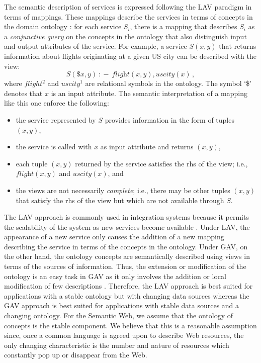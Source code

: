 \documentclass{llncs}
\newcommand{\qrule}{:\!\!-}
\newcommand{\flight}{\textit{flight}}
\newcommand{\UScity}{\textit{uscity}}
\begin{document}
The semantic description of services is expressed following the
LAV paradigm in terms of mappings. These mappings describe the
services in terms of concepts in the domain ontology \cite{Ullman00}:
for each service $S_i$, there is a mapping that describes $S_i$
as a \emph{conjunctive query} on the concepts in the ontology that
also distinguish input and output attributes of the service.
For example, a service $S(x,y)$ that returns information about
flights originating at a given US city can be described with the view:
\[ S(\$x,y)\ \qrule\ \flight(x,y), \UScity(x)\,, \]
where $flight^2$ and $uscity^1$ are relational symbols in the
ontology. The symbol `\$' denotes that $x$ is an input attribute. 
The semantic interpretation of a mapping like this one enforce the following:
\begin{itemize}
\item the service represented by $S$ provides information in the
      form of tuples $(x,y)$,
\item the service is called with $x$ as input attribute and returns $(x,y)$,
\item each tuple $(x,y)$ returned by the service satisfies the rhs
      of the view; i.e., $\flight(x,y)$ and $\UScity(x)$, and
\item the views are not necessarily \emph{complete}; i.e., there may be
      other tuples $(x,y)$ that satisfy the rhs of the view but which
      are not available through $S$.
\end{itemize}

The LAV approach is commonly used in integration systems because it permits
the scalability of the system as new services become available \cite{Ullman00}.
Under LAV, the appearance of a new service only causes the addition of a new
mapping describing the service in terms of the concepts in the ontology.
Under GAV, on the other hand, the ontology concepts are semantically described
using views in terms of the sources of information.
Thus, the extension or modification of the ontology is an easy task in GAV as
it only involves the addition or local modification of few descriptions
\cite{Ullman00}.
Therefore, the LAV approach is best suited for applications with a stable
ontology but with changing data sources whereas the GAV approach is best
suited for applications with stable data sources and a changing ontology.
For the Semantic Web, we assume that the ontology of concepts is the stable
component. We believe that this is a reasonable assumption since, once a
common language is agreed upon to describe Web resources, the only changing
characteristic is the number and nature of resources which constantly pop
up or disappear from the Web.
\end{document}
